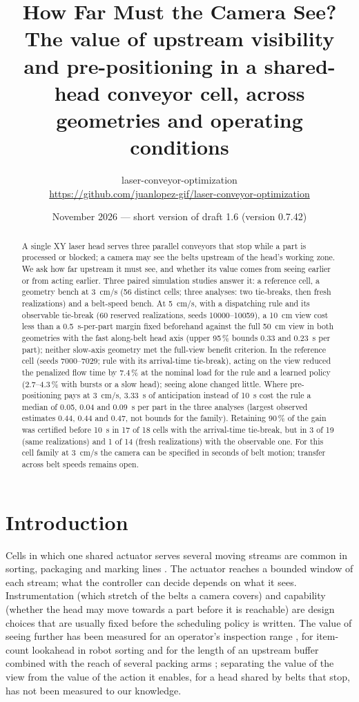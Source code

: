 \documentclass[11pt,a4paper]{article}
\title{\textbf{How Far Must the Camera See?}\\[0.3em]
\large The value of upstream visibility and pre-positioning in a shared-head conveyor cell,
across geometries and operating conditions}
\author{laser-conveyor-optimization\\\small\url{https://github.com/juanlopez-gif/laser-conveyor-optimization}}
\date{November 2026 --- short version of draft 1.6 (version 0.7.42)}
\begin{document}
\maketitle

\begin{abstract}
A single XY laser head serves three parallel conveyors that stop while a part is
processed or blocked; a camera may see the belts upstream of the head's working zone. We
ask how far upstream it must see, and whether its value comes from seeing earlier or from
acting earlier. Three paired simulation studies answer it: a reference cell, a geometry
bench at 3~cm/s (56 distinct cells; three analyses: two tie-breaks, then fresh
realizations) and a belt-speed bench. At 5~cm/s, with a dispatching rule and its observable tie-break (60 reserved
realizations, seeds 10000--10059), a 10~cm view
cost less than a 0.5~s-per-part margin fixed beforehand against the full 50~cm view in
both geometries with the fast along-belt head axis (upper 95\,\% bounds 0.33 and 0.23~s
per part); neither slow-axis geometry met the full-view benefit criterion. In the
reference cell (seeds 7000--7029; rule with its arrival-time tie-break), acting on the view
reduced the penalized flow time by 7.4\,\% at the nominal load for the rule and a learned
policy (2.7--4.3\,\% with bursts or a slow head);
seeing alone changed little. Where pre-positioning pays at 3~cm/s, 3.33~s of anticipation
instead of 10~s cost the rule a median of 0.05, 0.04 and 0.09~s per part in the three analyses
(largest observed estimates 0.44, 0.44 and 0.47, not bounds for the family).
Retaining 90\,\% of the gain was certified before 10~s in 17 of 18 cells with the
arrival-time tie-break, but in 3 of 19 (same realizations) and 1 of 14 (fresh realizations)
with the observable one. For this cell family at
3~cm/s the camera can be specified in seconds of belt motion; transfer across belt speeds remains
open.
\end{abstract}

\section{Introduction}
Cells in which one shared actuator serves several moving streams are common in sorting,
packaging and marking lines \cite{S01_Mattone2000,S02_Han2020,S03_Nielsen2023,S04_Schettini2023}.
The actuator reaches a bounded window of each stream; what the controller can decide
depends on what it sees. Instrumentation (which stretch of the belts a camera covers) and
capability (whether the head may move towards a part before it is reachable) are design
choices that are usually fixed before the scheduling policy is written. The value of
seeing further has been measured for an operator's inspection range \cite{Nawijn1981},
for item-count lookahead in robot sorting \cite{Li2026} and for the length of an upstream
buffer combined with the reach of several packing arms \cite{Ladefoged2026}; separating
the value of the view from the value of the action it enables, for a head shared by belts
that stop, has not been measured to our knowledge.
\end{document}
